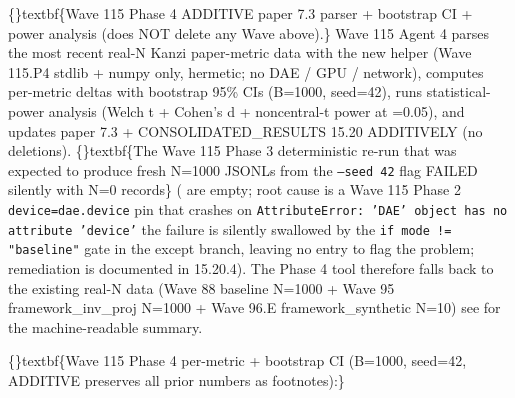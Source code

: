 \documentclass{article}
\begin{document}
\sloppy \{\}textbf\{Wave 115 Phase 4 ADDITIVE  paper 7.3 parser + bootstrap CI + power analysis (does NOT delete any Wave above).\} Wave 115 Agent 4 parses the most recent real-N Kanzi paper-metric data with the new helper  (Wave 115.P4  stdlib + numpy only, hermetic; no DAE / GPU / network), computes per-metric deltas with bootstrap 95\% CIs (B=1000, seed=42), runs statistical-power analysis (Welch t + Cohen's d + noncentral-t power at =0.05), and updates paper 7.3 + CONSOLIDATED\_RESULTS 15.20 ADDITIVELY (no deletions). \{\}textbf\{The Wave 115 Phase 3 deterministic re-run that was expected to produce fresh N=1000 JSONLs from the \texttt{--seed 42} flag FAILED silently with N=0 records\} ( are empty; root cause is a Wave 115 Phase 2 \texttt{device=dae.device} pin that crashes on \texttt{AttributeError: 'DAE' object has no attribute 'device'}  the failure is silently swallowed by the \texttt{if mode != "baseline"} gate in the  except branch, leaving no  entry to flag the problem; remediation is documented in  15.20.4). The Phase 4 tool therefore falls back to the existing real-N data (Wave 88 baseline N=1000 + Wave 95 framework\_inv\_proj N=1000 + Wave 96.E framework\_synthetic N=10)  see  for the machine-readable summary.

\{\}textbf\{Wave 115 Phase 4 per-metric  + bootstrap CI (B=1000, seed=42, ADDITIVE  preserves all prior numbers as footnotes):\}
\end{document}
